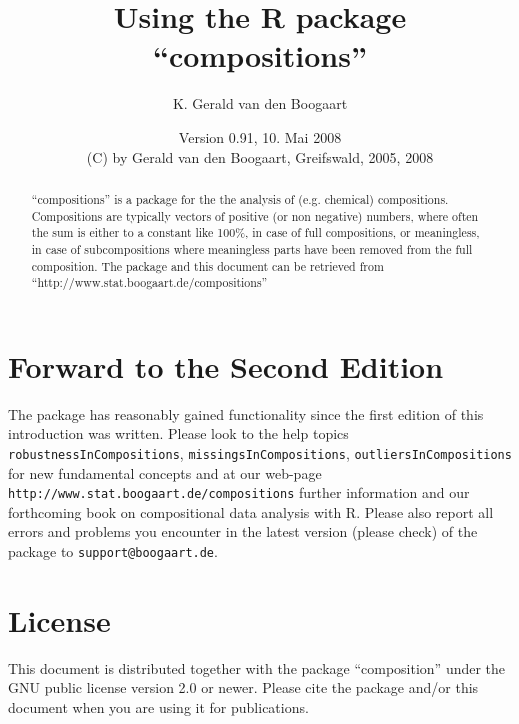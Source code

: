 \documentclass{article}
\author{K. Gerald van den Boogaart}
\title{Using the R package ``compositions''}
\date{Version 0.91, 10. Mai 2008\\
(C) by Gerald van den Boogaart, Greifswald, 2005, 2008}
\begin{document}
\maketitle
\begin{abstract}
  ``compositions'' is a package for the the analysis of (e.g. chemical)
  compositions. Compositions are typically vectors of positive (or non
  negative) numbers, where often the sum is either to a constant like 100\%,
  in case of full compositions, or meaningless, in case of subcompositions
  where meaningless parts have been removed from the full composition. The
  package and this document can be retrieved from
  ``http://www.stat.boogaart.de/compositions''
\end{abstract}
\section*{Forward to the Second Edition}
The package has reasonably gained functionality since the first edition of
this introduction was written. Please look to the help topics
\verb+robustnessInCompositions+, \verb+missingsInCompositions+,
\verb+outliersInCompositions+ for new fundamental concepts and at our web-page
\verb+http://www.stat.boogaart.de/compositions+ further information and our
forthcoming book on compositional data analysis with R. Please also report all
errors and problems you encounter in the latest version (please check) of the
package to \verb+support@boogaart.de+.

\section{License}
This document is distributed together with the package ``composition'' under
the GNU public license version 2.0 or newer. Please cite the package and/or
this document when you are using it for publications.
\end{document}
